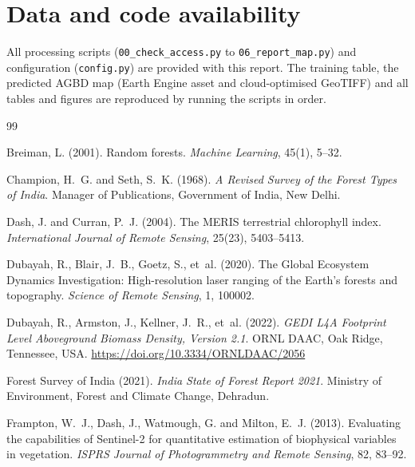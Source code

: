 \documentclass[11pt,a4paper]{article}
\begin{document}
\section*{Data and code availability}

All processing scripts (\texttt{00\_check\_access.py} to \texttt{06\_report\_map.py}) and
configuration (\texttt{config.py}) are provided with this report. The training table, the
predicted AGBD map (Earth Engine asset and cloud-optimised GeoTIFF) and all tables and figures
are reproduced by running the scripts in order.

\begin{thebibliography}{99}

Breiman, L. (2001). Random forests. \textit{Machine Learning}, 45(1), 5--32.

Champion, H.~G. and Seth, S.~K. (1968). \textit{A Revised Survey of the Forest Types of
India}. Manager of Publications, Government of India, New Delhi.

Dash, J. and Curran, P.~J. (2004). The MERIS terrestrial chlorophyll index.
\textit{International Journal of Remote Sensing}, 25(23), 5403--5413.

Dubayah, R., Blair, J.~B., Goetz, S., et~al. (2020). The Global Ecosystem Dynamics
Investigation: High-resolution laser ranging of the Earth's forests and topography.
\textit{Science of Remote Sensing}, 1, 100002.

Dubayah, R., Armston, J., Kellner, J.~R., et~al. (2022). \textit{GEDI L4A Footprint Level
Aboveground Biomass Density, Version 2.1}. ORNL DAAC, Oak Ridge, Tennessee, USA.
\url{https://doi.org/10.3334/ORNLDAAC/2056}

Forest Survey of India (2021). \textit{India State of Forest Report 2021}. Ministry of
Environment, Forest and Climate Change, Dehradun.

Frampton, W.~J., Dash, J., Watmough, G. and Milton, E.~J. (2013). Evaluating the capabilities
of Sentinel-2 for quantitative estimation of biophysical variables in vegetation.
\textit{ISPRS Journal of Photogrammetry and Remote Sensing}, 82, 83--92.


\end{thebibliography}
\end{document}
